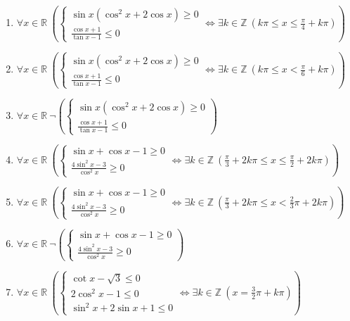 \documentclass[11pt,a4paper]{article}
\begin{document}
\begin{enumerate}
\item $\displaystyle \forall x \in \mathbb{R}\ \left( \begin{cases} \sin x(\cos^{2} x + 2\cos x) \ge 0 \\ \frac{\cos x + 1}{\tan x - 1} \le 0 \end{cases} \iff \exists k \in \mathbb{Z}\ \left( k\pi \le x \le \frac{\pi}{4} + k\pi \right) \right)$
\item $\displaystyle \forall x \in \mathbb{R}\ \left( \begin{cases} \sin x(\cos^{2} x + 2\cos x) \ge 0 \\ \frac{\cos x + 1}{\tan x - 1} \le 0 \end{cases} \iff \exists k \in \mathbb{Z}\ \left( k\pi \le x < \frac{\pi}{6} + k\pi \right) \right)$
\item $\displaystyle \forall x \in \mathbb{R}\ \lnot \left( \begin{cases} \sin x(\cos^{2} x + 2\cos x) \ge 0 \\ \frac{\cos x + 1}{\tan x - 1} \le 0 \end{cases} \right)$
\item $\displaystyle \forall x \in \mathbb{R}\ \left( \begin{cases} \sin x + \cos x - 1 \ge 0 \\ \frac{4\sin^{2} x - 3}{\cos^{2} x} \ge 0 \end{cases} \iff \exists k \in \mathbb{Z}\ \left( \frac{\pi}{3} + 2k\pi \le x \le \frac{\pi}{2} + 2k\pi \right) \right)$
\item $\displaystyle \forall x \in \mathbb{R}\ \left( \begin{cases} \sin x + \cos x - 1 \ge 0 \\ \frac{4\sin^{2} x - 3}{\cos^{2} x} \ge 0 \end{cases} \iff \exists k \in \mathbb{Z}\ \left( \frac{\pi}{3} + 2k\pi \le x < \frac{2}{3}\pi + 2k\pi \right) \right)$
\item $\displaystyle \forall x \in \mathbb{R}\ \lnot \left( \begin{cases} \sin x + \cos x - 1 \ge 0 \\ \frac{4\sin^{2} x - 3}{\cos^{2} x} \ge 0 \end{cases} \right)$
\item $\displaystyle \forall x \in \mathbb{R}\ \left( \begin{cases} \cot x - \sqrt{3} \le 0 \\ 2\cos^{2} x - 1 \le 0 \\ \sin^{2} x + 2\sin x + 1 \le 0 \end{cases} \iff \exists k \in \mathbb{Z}\ \left( x = \frac{3}{2}\pi + k\pi \right) \right)$

\end{enumerate}
\end{document}
